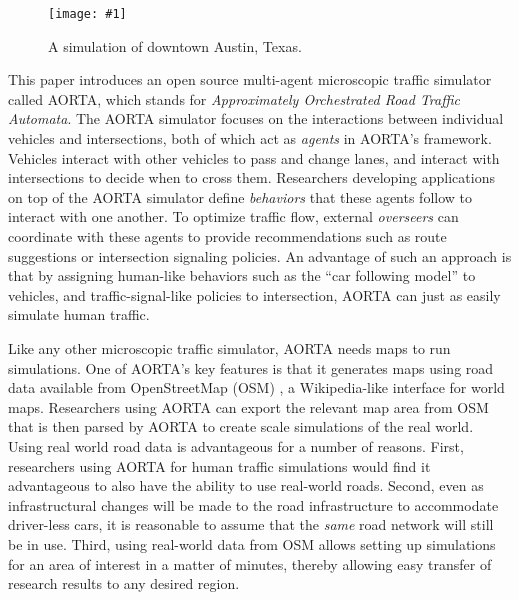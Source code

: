 \documentclass[letterpaper, 10 pt, conference]{ieeeconf}  %
\newcommand{\pix}[3]{
  \begin{figure}[h]
    \centering \texttt{[image: \#1]}
    \caption{#2}
  \end{figure}
}
\begin{document}



\pix{downtown_atx.png}{A simulation of downtown Austin, Texas.}{scale=0.25}

This paper introduces an open source multi-agent microscopic traffic
simulator called AORTA, which stands for \textit{Approximately
Orchestrated Road Traffic Automata}. The AORTA simulator focuses on
the interactions between individual vehicles and intersections, both
of which act as \textit{agents} in AORTA's framework. Vehicles
interact with other vehicles to pass and change lanes, and interact
with intersections to decide when to cross them. Researchers
developing applications on top of the AORTA simulator define
\textit{behaviors} that these agents follow to interact with one
another. To optimize traffic flow, external \textit{overseers} can
coordinate with these agents to provide recommendations such as route
suggestions or intersection signaling policies.  An advantage of such
an approach is that by assigning human-like behaviors such as the
``car following model'' \cite{brackstone1999car} to vehicles, and
traffic-signal-like policies to intersection, AORTA can just as easily
simulate human traffic.

Like any other microscopic traffic simulator, AORTA needs maps to run
simulations. One of AORTA's key features is that it generates maps using road data available from OpenStreetMap
(OSM) \cite{osm}, a Wikipedia-like interface for world maps. Researchers using
AORTA can export the relevant map area from OSM that is then parsed by AORTA to
create scale simulations of the real world. Using real world road data is
advantageous for a number of reasons. First, researchers using AORTA for human
traffic simulations would find it advantageous to also have the ability to use
real-world roads. Second, even as infrastructural changes will be made to the
road infrastructure to accommodate driver-less cars, it is reasonable to assume
that the \textit{same} road network will still be in use. Third, using
real-world data from OSM allows setting up simulations for an area of interest
in a matter of minutes, thereby allowing easy transfer of research results to
any desired region.
\end{document}
